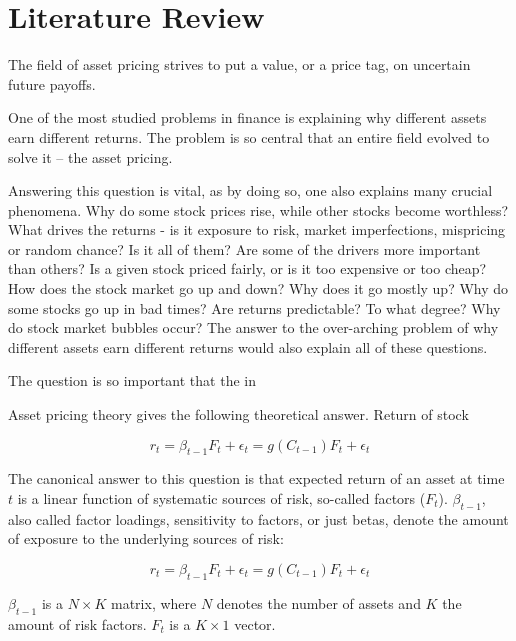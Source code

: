 \chapter{Literature Review}
\label{chap:lit} 
	
 	
 	The field of asset pricing strives to put a value, or a price tag, on uncertain future payoffs. 
 	
 	One of the most studied problems in finance is explaining why different assets earn different returns. The problem is so central that an entire field evolved to solve it – the asset pricing. 
 	
 	
 	Answering this question is vital, as by doing so, one also explains many crucial phenomena. Why do some stock prices rise, while other stocks become worthless? What drives the returns - is it exposure to risk, market imperfections, mispricing or random chance? Is it all of them? Are some of the drivers more important than others? Is a given stock priced fairly, or is it too expensive or too cheap? How does the stock market go up and down? Why does it go mostly up? Why do some stocks go up in bad times? Are returns predictable? To what degree? Why do stock market bubbles occur? The answer to the over-arching problem of why different assets earn different returns would also explain all of these questions.  
 	
 	The question is so important that the in
 	
 	Asset pricing theory gives the following theoretical answer. Return of stock 
 	
 	\begin{equation}
 	r_t = \beta_{t-1}F_t + \epsilon_t  = g(C_{t-1})F_t + \epsilon_t \label{eq:asset_pricing}
 	\end{equation}
 	
 	The canonical answer to this question is that expected return of an asset at time $t$ is a linear function of systematic sources of risk, so-called factors ($F_t$). $\beta_{t-1}$, also called factor loadings, sensitivity to factors, or just betas, denote the amount of exposure to the underlying sources of risk: 
		
		\begin{equation}
			r_t = \beta_{t-1}F_t + \epsilon_t  = g(C_{t-1})F_t + \epsilon_t \label{eq:asset_pricing}
		\end{equation}
		
	
	
	
	$\beta_{t-1}$ is a $N \times K$ matrix, where $N$ denotes the number of assets and $K$ the amount of risk factors. $F_t$ is a $K \times1 $ vector.
	
